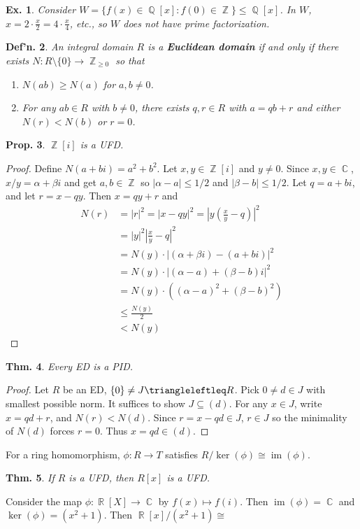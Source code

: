 \documentclass[12pt, a4paper]{book}
\DeclareMathOperator{\Q}{\mathbb{Q}}
\DeclareMathOperator{\Z}{\mathbb{Z}}
\DeclareMathOperator{\R}{\mathbb{R}}
\DeclareMathOperator{\C}{\mathbb{C}}
\DeclareMathOperator{\im}{im}
\newtheorem{theorem}{Thm.}[section]
\newtheorem{definition}[theorem]{Def'n.}
\newtheorem{proposition}[theorem]{Prop.}
\newtheorem{example}[theorem]{Ex.}
\theoremstyle{nonumberplain}
\newtheorem{proof}{Proof}
\begin{document}
\begin{example}
    Consider $W=\{f(x)\in\Q[x]:f(0)\in\Z\}\leq\Q[x]$.
    In $W$, $x=2\cdot\frac{x}{2}=4\cdot\frac{x}{4}$, etc., so $W$ does not have prime factorization.
\end{example}
\begin{definition}
    An integral domain $R$ is a \textbf{Euclidean domain} if and only if there exists $N:R\setminus\{0\}\to\Z_{\geq 0}$ so that
    \begin{enumerate}[nolistsep]
        \item $N(ab)\geq N(a)$ for $a,b\neq 0$.
        \item For any $ab\in R$ with $b\neq 0$, there exists $q,r\in R$ with $a=qb+r$ and either $N(r)<N(b)$ or $r=0$.
    \end{enumerate}
\end{definition}
\begin{proposition}
    $\Z[i]$ is a UFD.
\end{proposition}
\begin{proof}
    Define $N(a+bi)=a^2+b^2$.
    Let $x,y\in\Z[i]$ and $y\neq 0$.
    Since $x,y\in\C$, $x/y=\alpha+\beta i$ and get $a,b\in\Z$ so $|\alpha-a|\leq 1/2$ and $|\beta-b|\leq 1/2$.
    Let $q=a+bi$, and let $r=x-qy$.
    Then $x=qy+r$ and
    \begin{align*}
        N(r)&=|r|^2=|x-qy|^2=\left\lvert y\left(\frac{x}{y}-q\right)\right\rvert^2\\
            &=|y|^2\left\lvert\frac{x}{y}-q\right\rvert^2\\
            &= N(y)\cdot|(\alpha+\beta i)-(a+bi)|^2\\
            &= N(y)\cdot|(\alpha-a)+(\beta-b)i|^2\\
            &= N(y)\cdot\left((\alpha-a)^2+(\beta-b)^2\right)\\
            &\leq \frac{N(y)}{2}\\
            &< N(y)
    \end{align*}
\end{proof}
\begin{theorem}
    Every ED is a PID.
\end{theorem}
\begin{proof}
    Let $R$ be an ED, $\{0\}\neq J\triangleleftleq R$.
    Pick $0\neq d\in J$ with smallest possible norm.
    It suffices to show $J\subseteq (d)$.
    For any $x\in J$, write $x=qd+r$, and $N(r)<N(d)$.
    Since $r=x-qd\in J$, $r\in J$ so the minimality of $N(d)$ forces $r=0$.
    Thus $x=qd\in(d)$.
\end{proof}
For a ring homomorphism, $\phi:R\to T$ satisfies $R/\ker(\phi)\cong\im(\phi)$.
\begin{theorem}
    If $R$ is a UFD, then $R[x]$ is a UFD.
\end{theorem}
Consider the map $\phi:\R[X]\to\C$ by $f(x)\mapsto f(i)$.
Then $\im(\phi)=\C$ and $\ker(\phi)=(x^2+1)$.
Then $\R[x]/(x^2+1)\cong$
\end{document}
